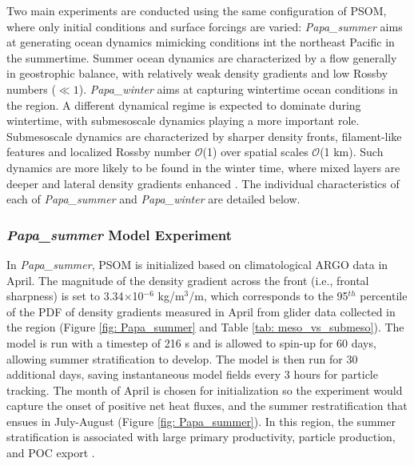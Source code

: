 \documentclass[draft,linenumbers]{agujournal2018}
\begin{document}
Two main experiments are conducted using the same configuration of PSOM, where only initial conditions and surface forcings are varied: \textit{Papa\_summer} aims at generating ocean dynamics mimicking conditions int the northeast Pacific in the summertime. Summer ocean dynamics are characterized by a flow generally in geostrophic balance, with relatively weak density gradients and low Rossby numbers ($\ll1$). \textit{Papa\_winter} aims at capturing wintertime ocean conditions in the region. A different dynamical regime is expected to dominate during wintertime, with submesoscale dynamics playing a more important role. Submesoscale dynamics are characterized by sharper density fronts, filament-like features and localized Rossby number $\mathcal{O}$(1) over spatial scales $\mathcal{O}$(1 km). Such dynamics are more likely to be found in the winter time, where mixed layers are deeper and lateral density gradients enhanced \citep{Thompson_2016}. The individual characteristics of each of \textit{Papa\_summer} and \textit{Papa\_winter} are detailed below.

\subsubsection{\textit{Papa\_summer} Model Experiment}

In \textit{Papa\_summer}, PSOM is initialized based on climatological ARGO data in April. The magnitude of the density gradient across the front (i.e., frontal sharpness) is set to 3.34$\times$10$^{-6}$ kg/m$^3$/m, which corresponds to the 95$^{th}$ percentile of the PDF of density gradients measured in April from glider data collected in the region (Figure \ref{fig: Papa_summer} and Table \ref{tab: meso_vs_submeso}). The model is run with a timestep of 216 s and is allowed to spin-up for 60 days, allowing summer stratification to develop. The model is then run for 30 additional days, saving instantaneous model fields every 3 hours for particle tracking. The month of April is chosen for initialization so the experiment would capture the onset of positive net heat fluxes, and the summer restratification that ensues in July-August (Figure \ref{fig: Papa_summer}). In this region, the summer stratification is associated with large primary productivity, particle production, and POC export \citep[e.g., fecal pallets, dead phytoplankter; ][]{Plant_2016}.
\end{document}
